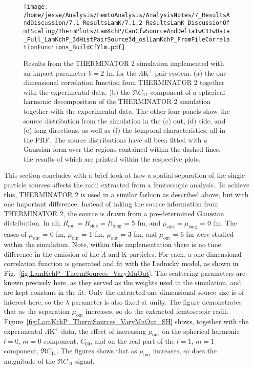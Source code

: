 \documentclass[ALICE,manyauthors]{cernphprep}
\newcommand{\Lam}{$\Lambda$\xspace}
\newcommand{\LamKchP}{$\Lambda\mathrm{K^{+}}$\xspace}
\begin{document}
\begin{figure}[h!]
  \centering
  \texttt{[image: /home/jesse/Analysis/FemtoAnalysis/AnalysisNotes/7\_ResultsAndDiscussion/7.1\_ResultsLamK/7.1.2\_ResultsLamK\_DiscussionOfmTScaling/ThermPlots/LamKchP/CanCfwSourceAndDeltaTwC11wData\_Full\_LamKchP\_3dHistPairSource3d\_oslLamKchP\_FromFileCorrelationFunctions\_BuildCfYlm.pdf]}
  \caption[THERMINATOR 2 simulatin for \LamKchP]
  {
  Results from the THERMINATOR 2 simulation implemented with an impact parameter $b = 2$ fm for the \LamKchP pair system.
  (a) the one-dimensional correlation function from THERMINATOR 2 together with the experimental data.
  (b) the $\Re C_{11}$ component of a spherical harmonic decomposition of the THERMINATOR 2 simulation together with the experimental data.
  The other four panels show the source distribution from the simulation in the (c) out, (d) side, and (e) long directions, as well as (f) the temporal characteristics, all in the PRF.
  The source distributions have all been fitted with a Gaussian form {\color{blue}over the regions contained within the dashed lines}, the results of which are printed within the respective plots.
  }
  \label{fig:LamKchP_StdThermSources}
\end{figure}



This section concludes with a brief look at how a spatial separation of the single particle sources affects the radii extracted from a femtoscopic analysis.
To achieve this, THERMINATOR 2 is used in a similar fashion as described above, but with one important difference.
Instead of taking the source information from THERMINATOR 2, the source is drawn from a pre-determined Gaussian distribution.
In all, $R_{\mathrm{out}} = R_{\mathrm{side}} = R_{\mathrm{long}}$ = 5 fm, and $\mu_{\mathrm{side}} = \mu_{\mathrm{long}}$ = 0 fm.
The cases of $\mu_{\mathrm{out}}$ = 0 fm, $\mu_{\mathrm{out}}$ = 1 fm, $\mu_{\mathrm{out}}$ = 3 fm, and $\mu_{\mathrm{out}}$ = 6 fm were studied within the simulation.
Note, within this implementation there is no time difference in the emission of the \Lam and K particles.
For each, a one-dimensional correlation function is generated and fit with the Lednick\'y model, as shown in Fig.~\ref{fig:LamKchP_ThermSources_VaryMuOut}.
The scattering parameters are known precisely here, as they served as the weights used in the simulation, and are kept constant in the fit.
Only the extracted one-dimensional source size is of interest here, so the $\lambda$ parameter is also fixed at unity.
The figure demonstrates that as the separation $\mu_{\mathrm{out}}$ increases, so do the extracted femtoscopic radii.
Figure~\ref{fig:LamKchP_ThermSources_VaryMuOut_SH} shows, together with the experimental \LamKchP data, the effect of increasing $\mu_{\mathrm{out}}$ on the spherical harmonic $l=0$, $m=0$ component, $C_{00}$, and on the real part of the $l=1$, $m=1$ component, $\Re C_{11}$.
The figures shows that as $\mu_{\mathrm{out}}$ increases, so does the magnitude of the $\Re C_{11}$ signal.
\end{document}
